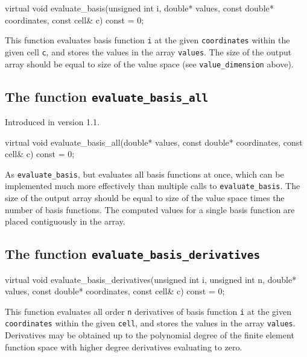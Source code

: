 \begin{code}
virtual void evaluate_basis(unsigned int i,
                            double* values,
                            const double* coordinates,
                            const cell& c) const = 0;
\end{code}

This function evaluates basis function \texttt{i} at the given
\texttt{coordinates} within the given cell \texttt{c}, and stores the
values in the array \texttt{values}. The size of the output array
should be equal to size of the value space (see
\texttt{value\_dimension} above).

\subsection{The function \texttt{evaluate\_basis\_all}}
Introduced in version 1.1.

\begin{code}
virtual void evaluate_basis_all(double* values,
                                const double* coordinates,
                                const cell& c) const = 0;
\end{code}

As \texttt{evaluate\_basis}, but evaluates all basis functions at
once, which can be implemented much more effectively than multiple
calls to \texttt{evaluate\_basis}. The size of the output array
should be equal to size of the value space times the number of
basis functions. The computed values for a single basis function
are placed contiguously in the array.

\subsection{The function \texttt{evaluate\_basis\_derivatives}}

\begin{code}
virtual void
evaluate_basis_derivatives(unsigned int i,
                           unsigned int n,
                           double* values,
                           const double* coordinates,
                           const cell& c) const = 0;
\end{code}

This function evaluates all order \texttt{n} derivatives of basis
function \texttt{i} at the given \texttt{coordinates} within the given
\texttt{cell}, and stores the values in the array \texttt{values}.
Derivatives may be obtained up to the polynomial degree of the finite
element function space with higher degree derivatives evaluating to
zero.


